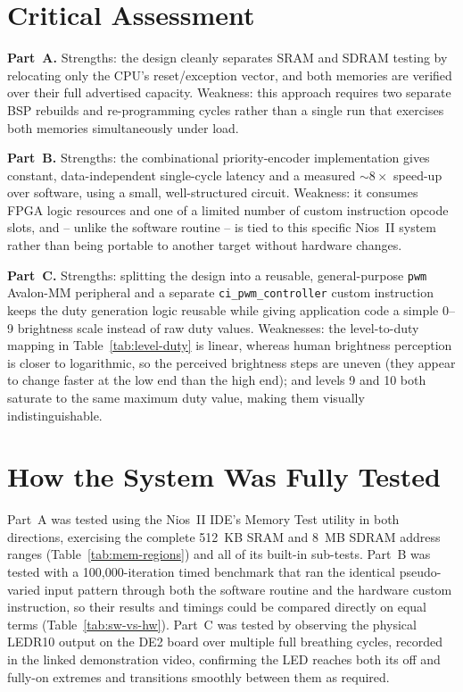 \documentclass[
    12pt,
    a4paper
]{report}
\begin{document}
\section{Critical Assessment}

\textbf{Part~A.} Strengths: the design cleanly separates SRAM and SDRAM testing by relocating only
the CPU's reset/exception vector, and both memories are verified over their full advertised
capacity. Weakness: this approach requires two separate BSP rebuilds and re-programming cycles
rather than a single run that exercises both memories simultaneously under load.

\textbf{Part~B.} Strengths: the combinational priority-encoder implementation gives constant,
data-independent single-cycle latency and a measured $\sim\!8\times$ speed-up over software, using
a small, well-structured circuit. Weakness: it consumes FPGA logic resources and one of a limited
number of custom instruction opcode slots, and -- unlike the software routine -- is tied to this
specific Nios~II system rather than being portable to another target without hardware changes.

\textbf{Part~C.} Strengths: splitting the design into a reusable, general-purpose \texttt{pwm}
Avalon-MM peripheral and a separate \texttt{ci\_pwm\_controller} custom instruction keeps the duty
generation logic reusable while giving application code a simple 0--9 brightness scale instead of
raw duty values. Weaknesses: the level-to-duty mapping in Table~\ref{tab:level-duty} is linear,
whereas human brightness perception is closer to logarithmic, so the perceived brightness steps are
uneven (they appear to change faster at the low end than the high end); and levels 9 and 10 both
saturate to the same maximum duty value, making them visually indistinguishable.

\section{How the System Was Fully Tested}

Part~A was tested using the Nios~II IDE's Memory Test utility in both directions, exercising the
complete 512~KB SRAM and 8~MB SDRAM address ranges (Table~\ref{tab:mem-regions}) and all of its
built-in sub-tests. Part~B was tested with a 100{,}000-iteration timed benchmark that ran the
identical pseudo-varied input pattern through both the software routine and the hardware custom
instruction, so their results and timings could be compared directly on equal terms
(Table~\ref{tab:sw-vs-hw}). Part~C was tested by observing the physical LEDR10 output on the DE2
board over multiple full breathing cycles, recorded in the linked demonstration video, confirming
the LED reaches both its off and fully-on extremes and transitions smoothly between them as
required.



\end{document}
